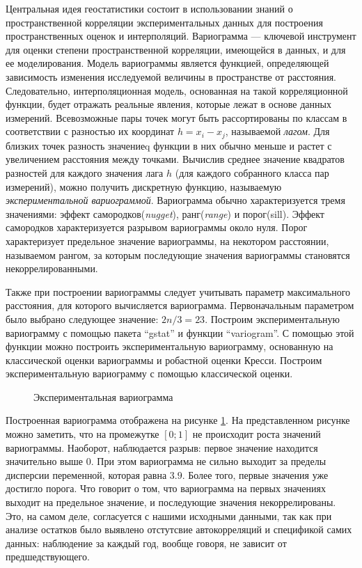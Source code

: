 Центральная идея геостатистики состоит в использовании знаний о пространственной корреляции экспериментальных данных для построения пространственных оценок и интерполяций. Вариограмма --- ключевой инструмент для оценки степени пространственной корреляции, имеющейся в данных, и для ее моделирования. Модель вариограммы является функцией, определяющей зависимость изменения исследуемой величины в пространстве от расстояния. Следовательно, интерполяционная модель, основанная на такой корреляционной функции, будет отражать реальные явления, которые лежат в основе данных измерений. Всевозможные пары точек могут быть рассортированы по классам в соответствии с разностью их координат $h = x_i - x_j$, называемой \textit{лагом}. Для близких точек разность значениеq функции в них обычно меньше и растет с увеличением расстояния между точками. Вычислив среднее значение квадратов разностей для каждого значения лага $h$ (для каждого собранного класса пар измерений), можно получить дискретную функцию, называемую \textit{экспериментальной вариограммой}. Вариограмма обычно характеризуется тремя значениями: эффект самородков(\textit{nugget}), ранг(\textit{range}) и порог(sill). Эффект самородков характеризуется разрывом вариограммы около нуля. Порог характеризует предельное значение вариограммы, на некотором расстоянии, называемом рангом, за которым последующие значения вариограммы становятся некоррелированными.

Также при построении вариограммы следует учитывать параметр максимального расстояния, для которого вычисляется вариограмма. Первоначальным параметром было выбрано следующее значение: $2n/3=23$.
Построим экспериментальную вариограмму с помощью пакета ``gstat'' и функции ``variogram''. С помощью этой функции можно построить экспериментальную вариограмму, основанную на классической оценки вариограммы и робастной оценки Кресси. Построим экспериментальную вариограмму с помощью классической оценки.

\begin{figure}[ht]
\caption{Экспериментальная вариограмма}
\label{img:classical_emp}
\end{figure}

Построенная вариограмма отображена на рисунке \ref{img:classical_emp}. На представленном рисунке можно заметить, что на промежутке $[0;1]$ не происходит роста значений вариограммы. Наоборот, наблюдается разрыв: первое значение находится значительно выше $0$. При этом вариограмма не сильно выходит за пределы дисперсии переменной, которая равна $3.9$. Более того, первые значения уже достигло порога. Что говорит о том, что вариограмма на первых значениях выходит на предельное значение, и последующие значения некоррелированы. Это, на самом деле, согласуется с нашими исходными данными, так как при анализе остатков было выявлено отстутсвие автокорреляций и спецификой самих данных: наблюдение за каждый год, вообще говоря, не зависит от предшедствующего.

